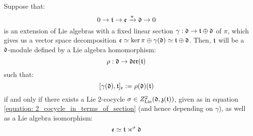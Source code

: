         \begin{proposition} \label{prop: twisted_semi_direct_product_criterion}
            Suppose that:
                $$0 \to \mathfrak{t} \to \mathfrak{e} \xrightarrow[]{\pi} \mathfrak{d} \to 0$$
            is an extension of Lie algebras with a fixed linear section $\gamma: \mathfrak{d} \to \mathfrak{t} \oplus \mathfrak{d}$ of $\pi$, which gives us a vector space decomposition $\mathfrak{e} \simeq \ker \pi \oplus \gamma(\mathfrak{d}) \simeq \mathfrak{t} \oplus \mathfrak{d}$. Then, $\mathfrak{t}$ will be a $\mathfrak{d}$-module defined by a Lie algebra homomorphism:
                $$\rho: \mathfrak{d} \to \mathfrak{der}(\mathfrak{t})$$
            such that:
                $$[\gamma(\mathfrak{d}), \mathfrak{t}]_{\mathfrak{e}} := \rho(\mathfrak{d})(\mathfrak{t})$$
            if and only if there exists a Lie $2$-cocycle $\sigma \in Z^2_{\mathrm{Lie}}(\mathfrak{d}, \mathfrak{z}(\mathfrak{t}))$, given as in equation \eqref{equation: 2_cocycle_in_terms_of_section} (and hence depending on $\gamma$), as well as a Lie algebra isomorphism:
                $$\mathfrak{e} \simeq \mathfrak{t} \rtimes^{\sigma} \mathfrak{d}$$
        \end{proposition}
